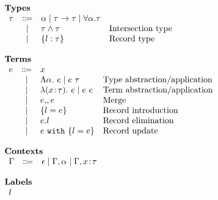 \[
\begin{array}{l}

    \textbf{Types} \\
    \begin{array}{rcll}
        \tau & \Coloneqq & \alpha \mid \tau \to \tau \mid \forall \alpha. \tau & \\
          & \mid      & \tau \wedge \tau                                  & \text{Intersection type} \\
          & \mid      & \{ l : \tau \}                            & \text{Record type}
    \end{array} \\ \\

    \textbf{Terms} \\
    \begin{array}{rcll}
        e & \Coloneqq & x                               & \\
          & \mid      & \Lambda \alpha.~ e \mid {e} ~ {\tau} & \text{Type abstraction/application} \\
          & \mid      & \lambda (x \!:\! \tau).~ e \mid {e} ~ {e} & \text{Term abstraction/application} \\
          & \mid      & e ,\!, e                     & \text{Merge} \\
          & \mid      & \{ l = e \}                & \text{Record introduction} \\
          & \mid      & e.l                             & \text{Record elimination} \\
          & \mid      & e ~ \texttt{with} ~ \{ l = e \}             & \text{Record update}
    \end{array} \\ \\

    \textbf{Contexts} \\
    \begin{array}{rcl}
        \Gamma & \Coloneqq & \epsilon \mid \Gamma, \alpha \mid \Gamma, x \!:\! \tau
    \end{array} \\ \\

    \textbf{Labels} \\
    \begin{array}{r}
        l
    \end{array}

\end{array}
\]
